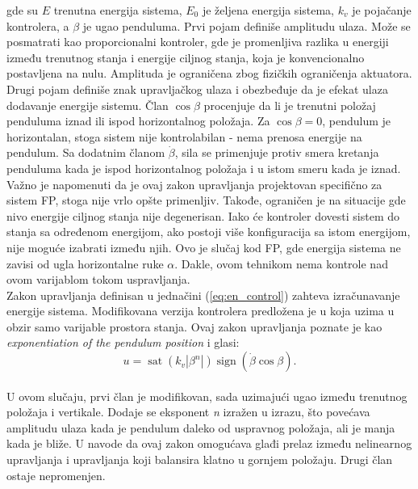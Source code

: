\documentclass[a4paper,11pt]{article}
\theoremstyle{definition} \newtheorem{deff}{Definicija}[section]
\theoremstyle{definition} \newtheorem{prim}[deff]{Primer}
\theoremstyle{plain} \newtheorem{teor}[deff]{Teorema}
\begin{document}
	
	gde su $\textit{E}$ trenutna energija sistema, 
	$\textit{E}_0$ je željena energija sistema, $\textit{k}_v$ je pojačanje kontrolera, a $\beta$ je ugao penduluma. Prvi pojam definiše amplitudu ulaza. Može se posmatrati kao proporcionalni kontroler, gde je promenljiva razlika u energiji između trenutnog stanja i energije ciljnog stanja, koja je konvencionalno postavljena na nulu. Amplituda je ograničena zbog fizičkih ograničenja aktuatora. Drugi pojam definiše znak upravljačkog ulaza i obezbeđuje da je efekat ulaza dodavanje energije sistemu. Član $\cos \beta$ procenjuje da li je trenutni položaj penduluma iznad ili ispod horizontalnog položaja. Za $\cos \beta = 0$, pendulum je horizontalan, stoga sistem nije kontrolabilan - nema prenosa energije na pendulum. Sa dodatnim članom $\dot{\beta}$, sila se primenjuje protiv smera kretanja penduluma kada je ispod horizontalnog položaja i u istom smeru kada je iznad.\\
	
	Važno je napomenuti da je ovaj zakon upravljanja projektovan specifično za sistem FP, stoga nije vrlo opšte primenljiv. Takođe, ograničen je na situacije gde nivo energije ciljnog stanja nije degenerisan. Iako će kontroler dovesti sistem do stanja sa određenom energijom, ako postoji više konfiguracija sa istom energijom, nije moguće izabrati između njih. Ovo je slučaj kod FP, gde energija sistema ne zavisi od ugla horizontalne ruke $\alpha$. Dakle, ovom tehnikom nema kontrole nad ovom varijablom tokom uspravljanja. \\
	
	Zakon upravljanja definisan u jednačini (\ref{eq:en_control}) zahteva izračunavanje energije sistema. Modifikovana verzija kontrolera predložena je u \cite{energy_c} koja uzima u obzir samo varijable prostora stanja. Ovaj zakon upravljanja poznate je kao 
	\textit{exponentiation of the pendulum position} i glasi:\\
	
	\begin{equation}
		u = \operatorname{sat}(k_v |\beta^n|) \operatorname{sign}( \dot{\beta} \cos \beta).
	\end{equation} \\
	
	U ovom slučaju, prvi član je modifikovan, sada uzimajući ugao između trenutnog položaja i vertikale.
	Dodaje se eksponent \textit{n} izražen u izrazu, što povećava amplitudu ulaza kada je pendulum daleko od uspravnog položaja, ali je manja kada je bliže. U \cite{inicijalna} navode da ovaj zakon omogućava glađi prelaz između nelinearnog upravljanja i upravljanja koji balansira klatno u gornjem položaju. Drugi član ostaje nepromenjen. \\
	
\end{document}
